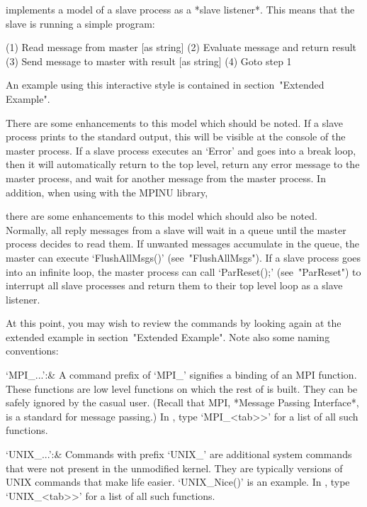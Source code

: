 

{\ParGAP} implements a model of a slave process as  a  *slave  listener*.
This means that the slave is running a simple program:

\begintt
  (1) Read message from master [as string]
  (2) Evaluate message and return result
  (3) Send message to master with result [as string]
  (4) Goto step 1
\endtt

An example using this interactive style is contained in section~"Extended
Example".

There are some enhancements to this model which should be noted. If  a  slave
process prints to the standard  output,  this  will  be  visible  at  the
console of the master process. If a slave process executes an `Error' and
goes into a break loop, then it will  automatically  return  to  the  top
level, return any error message to  the  master  process,  and  wait  for
another message from the master process. In addition, when using {\ParGAP} 
with the MPINU library, 

there are some enhancements
to this model which should also be  noted.  Normally, all reply
messages from a slave will wait in a  queue  until  the  master  process
decides to read them. If unwanted messages accumulate  in  the  queue,  the
master can execute  `FlushAllMsgs()'  (see~"FlushAllMsgs").  If a slave process goes into  an
infinite loop, the master process can call `ParReset();' (see~"ParReset")
to interrupt all slave processes and return them to their top level  loop
as a slave listener.

At this point, you may wish to review the commands by  looking  again  at
the extended example in section~"Extended Example". Note also some naming
conventions:

\beginitems
`MPI_...':&
A command prefix of `MPI_' signifies a {\GAP} binding of an MPI function.
These functions are low level functions on which the rest of {\ParGAP} is
built. They can be safely ignored by the casual user. (Recall  that  MPI,
*Message Passing Interface*, is  a  standard  for  message  passing.)  In
{\ParGAP}, type `MPI_\<<tab>>' for a list of all such functions.

`UNIX_...':&
Commands with prefix `UNIX_' are additional system commands that were not
present in the  unmodified  {\GAP}  kernel.  They  are  typically  {\GAP}
versions of UNIX commands that make  life  easier.  `UNIX_Nice()'  is  an
example. In {\ParGAP}, type  `UNIX_\<<tab>>'  for  a  list  of  all  such
functions.

